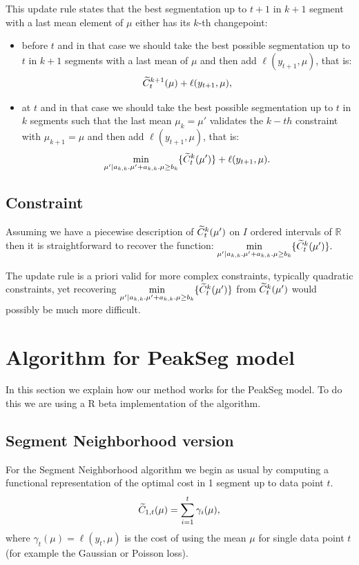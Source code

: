 \documentclass{article}
\begin{document}
This update rule states that the best segmentation up to $t+1$ in $k+1$ segment with a last mean element of $\mu$ either has its $k$-th changepoint:
\begin{itemize}
\item before $t$ and in that case we should take the best possible segmentation up to $t$ in $k+1$
segments with a last mean of $\mu$ and then add  $\ell(y_{t+1}, \mu)$, that is:
$$\widetilde{C}^{k+1}_{t}(\mu) + \ell(y_{t+1}, \mu),$$

\item at $t$ and in that case we should take the best possible segmentation up to $t$ in $k$ segments
such that the last mean $\mu_k=\mu'$ validates the $k-th$ constraint with $\mu_{k+1}=\mu$ and then add  $\ell(y_{t+1}, \mu)$, that is:
 $$\underset{\mu' | a_{k,k}. \mu' + a_{k,k}. \mu  \geq  b_{k}}{\min} \{ \widetilde{C}^{k}_{t}(\mu') \} + \ell(y_{t+1}, \mu).$$
\end{itemize}


\subsection{Constraint}
Assuming we have a piecewise description of $\widetilde{C}^{k}_{t}(\mu')$ on $I$ ordered intervals of $\mathbb{R}$
then it is straightforward to recover the function:
$\underset{\mu' | a_{k,k}. \mu' + a_{k,k}. \mu  \geq  b_{k}}{\min} \{ \widetilde{C}^{k}_{t}(\mu') \}.$

The update rule is a priori valid for more complex constraints, typically quadratic constraints, yet recovering
$\underset{\mu' | a_{k,k}. \mu' + a_{k,k}. \mu  \geq  b_{k}}{\min} \{ \widetilde{C}^{k}_{t}(\mu') \}$ from $\widetilde{C}^{k}_{t}(\mu')$ would possibly be much more difficult.


\section{Algorithm for PeakSeg model}

In this section we explain how our method works for the PeakSeg model.
To do this we are using a R beta implementation of the algorithm.

\subsection{Segment Neighborhood version}

For the Segment Neighborhood algorithm we begin as usual by computing
a functional representation of the optimal cost in 1 segment up to
data point $t$. 
\begin{equation*}
  \label{eq:C1b}
  \widetilde{C}_{1,t}(\mu) = \sum_{i=1}^t \gamma_i(\mu),
\end{equation*}
where $\gamma_t(\mu)=\ell(y_t, \mu)$ is the cost of using the mean
$\mu$ for single data point $t$ (for example the Gaussian or Poisson
loss).
\end{document}
